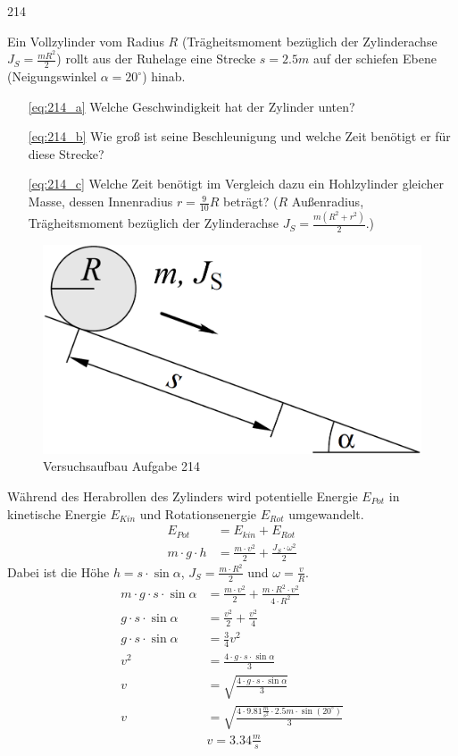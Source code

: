 \begin{auf}
    214
\end{auf}
Ein Vollzylinder vom Radius $R$ (Trägheitsmoment bezüglich der Zylinderachse $J_S =\frac{mR^2}{2}$) rollt aus der Ruhelage eine Strecke $s=2.5m$ auf der schiefen Ebene (Neigungswinkel $\alpha=20^\circ$) hinab.
\begin{enumerate}
    \item[\ref{eq:214_a}] Welche Geschwindigkeit hat der Zylinder unten?
    \item[\ref{eq:214_b}] Wie groß ist seine Beschleunigung und welche Zeit benötigt er für diese Strecke?
    \item[\ref{eq:214_c}] Welche Zeit benötigt im Vergleich dazu ein Hohlzylinder gleicher Masse, dessen Innenradius $r=\frac{9}{10}R$ beträgt? ($R$ Außenradius, Trägheitsmoment bezüglich der Zylinderachse $J_S=\frac{m(R^2 + r^2 )}{2}$.)
\end{enumerate}
\begin{figure}[h]
    \centering
    \includegraphics[width=0.7\linewidth]{images/214_0.png}
    \caption{Versuchsaufbau Aufgabe 214}
\end{figure}
Während des Herabrollen des Zylinders wird potentielle Energie $E_{Pot}$ in kinetische Energie $E_{Kin}$ und Rotationsenergie $E_{Rot}$ umgewandelt.
\begin{align*}
    E_{Pot}&=E_{kin}+E_{Rot}\\
    m\cdot g\cdot h&=\frac{m\cdot v^2}{2}+\frac{J_S\cdot\omega^2}{2}
\end{align*}
Dabei ist die Höhe $h=s\cdot\sin\alpha$, $J_S=\frac{m\cdot R^2}{2}$ und $\omega=\frac{v}{R}$.
\begin{align}
    m\cdot g\cdot s\cdot\sin\alpha&=\frac{m\cdot v^2}{2}+\frac{m\cdot R^2\cdot v^2}{4\cdot R^2}		\nonumber\\
    g\cdot s\cdot\sin\alpha&=\frac{v^2}{2}+\frac{v^2}{4}																		\nonumber\\
    g\cdot s\cdot\sin\alpha&=\frac{3}{4}v^2																								\nonumber\\
    v^2&=\frac{4\cdot g\cdot s\cdot\sin\alpha}{3}																						\nonumber\\
    v&=\sqrt{\frac{4\cdot g\cdot s\cdot\sin\alpha}{3}}																				\label{eq:214_velocity}\\
    v&=\sqrt{\frac{4\cdot 9.81\frac{m}{s^2}\cdot 2.5m\cdot\sin(20^\circ)}{3}}										\nonumber\\
    &\boxed{v=3.34\frac{m}{s}}	\tag{a}	\label{eq:214_a}
\end{align}
